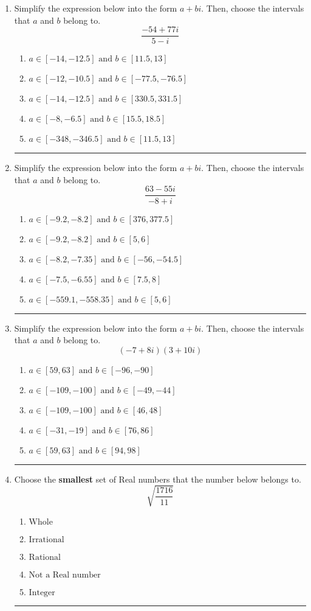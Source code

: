 \documentclass[14pt]{extbook}
\newcommand{\litem}[1]{\item#1\hspace*{-1cm}\rule{\textwidth}{0.4pt}}
\begin{document}
\begin{enumerate}
\litem{
Simplify the expression below into the form $a+bi$. Then, choose the intervals that $a$ and $b$ belong to.\[ \frac{-54 + 77 i}{5 - i} \]\begin{enumerate}[label=\Alph*.]
\item \( a \in [-14, -12.5] \text{ and } b \in [11.5, 13] \)
\item \( a \in [-12, -10.5] \text{ and } b \in [-77.5, -76.5] \)
\item \( a \in [-14, -12.5] \text{ and } b \in [330.5, 331.5] \)
\item \( a \in [-8, -6.5] \text{ and } b \in [15.5, 18.5] \)
\item \( a \in [-348, -346.5] \text{ and } b \in [11.5, 13] \)

\end{enumerate} }
\litem{
Simplify the expression below into the form $a+bi$. Then, choose the intervals that $a$ and $b$ belong to.\[ \frac{63 - 55 i}{-8 + i} \]\begin{enumerate}[label=\Alph*.]
\item \( a \in [-9.2, -8.2] \text{ and } b \in [376, 377.5] \)
\item \( a \in [-9.2, -8.2] \text{ and } b \in [5, 6] \)
\item \( a \in [-8.2, -7.35] \text{ and } b \in [-56, -54.5] \)
\item \( a \in [-7.5, -6.55] \text{ and } b \in [7.5, 8] \)
\item \( a \in [-559.1, -558.35] \text{ and } b \in [5, 6] \)

\end{enumerate} }
\litem{
Simplify the expression below into the form $a+bi$. Then, choose the intervals that $a$ and $b$ belong to.\[ (-7 + 8 i)(3 + 10 i) \]\begin{enumerate}[label=\Alph*.]
\item \( a \in [59, 63] \text{ and } b \in [-96, -90] \)
\item \( a \in [-109, -100] \text{ and } b \in [-49, -44] \)
\item \( a \in [-109, -100] \text{ and } b \in [46, 48] \)
\item \( a \in [-31, -19] \text{ and } b \in [76, 86] \)
\item \( a \in [59, 63] \text{ and } b \in [94, 98] \)

\end{enumerate} }
\litem{
Choose the \textbf{smallest} set of Real numbers that the number below belongs to.\[ \sqrt{\frac{1716}{11}} \]\begin{enumerate}[label=\Alph*.]
\item \( \text{Whole} \)
\item \( \text{Irrational} \)
\item \( \text{Rational} \)
\item \( \text{Not a Real number} \)
\item \( \text{Integer} \)


\end{enumerate}}
\end{enumerate}
\end{document}
